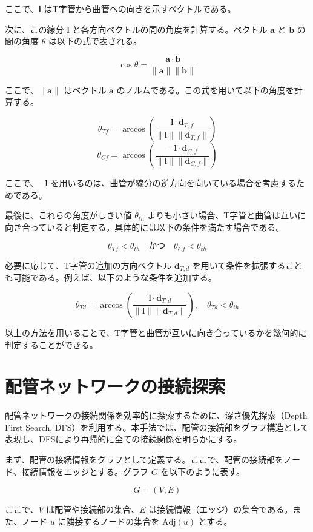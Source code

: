 ここで、$\mathbf{l}$ はT字管から曲管への向きを示すベクトルである。

次に、この線分 $\mathbf{l}$ と各方向ベクトルの間の角度を計算する。ベクトル $\mathbf{a}$ と $\mathbf{b}$ の間の角度 $\theta$ は以下の式で表される。

\[
\cos \theta = \frac{\mathbf{a} \cdot \mathbf{b}}{\|\mathbf{a}\| \|\mathbf{b}\|}
\]

ここで、$\|\mathbf{a}\|$ はベクトル $\mathbf{a}$ のノルムである。この式を用いて以下の角度を計算する。

\[
\theta_{Tf} = \arccos \left( \frac{\mathbf{l} \cdot \mathbf{d}_{T,f}}{\|\mathbf{l}\| \|\mathbf{d}_{T,f}\|} \right)
\]
\[
\theta_{Cf} = \arccos \left( \frac{-\mathbf{l} \cdot \mathbf{d}_{C,f}}{\|\mathbf{l}\| \|\mathbf{d}_{C,f}\|} \right)
\]

ここで、$-\mathbf{l}$ を用いるのは、曲管が線分の逆方向を向いている場合を考慮するためである。

最後に、これらの角度がしきい値 $\theta_{th}$ よりも小さい場合、T字管と曲管は互いに向き合っていると判定する。具体的には以下の条件を満たす場合である。

\[
\theta_{Tf} < \theta_{th} \quad \text{かつ} \quad \theta_{Cf} < \theta_{th}
\]

必要に応じて、T字管の追加の方向ベクトル $\mathbf{d}_{T,d}$ を用いて条件を拡張することも可能である。例えば、以下のような条件を追加する。

\[
\theta_{Td} = \arccos \left( \frac{\mathbf{l} \cdot \mathbf{d}_{T,d}}{\|\mathbf{l}\| \|\mathbf{d}_{T,d}\|} \right), \quad \theta_{Td} < \theta_{th}
\]

以上の方法を用いることで、T字管と曲管が互いに向き合っているかを幾何的に判定することができる。



\section{配管ネットワークの接続探索}
配管ネットワークの接続関係を効率的に探索するために、深さ優先探索（Depth First Search, DFS）を利用する。本手法では、配管の接続部をグラフ構造として表現し、DFSにより再帰的に全ての接続関係を明らかにする。

まず、配管の接続情報をグラフとして定義する。ここで、配管の接続部をノード、接続情報をエッジとする。グラフ $G$ を以下のように表す。

\[
G = (V, E)
\]

ここで、$V$ は配管や接続部の集合、$E$ は接続情報（エッジ）の集合である。また、ノード $u$ に隣接するノードの集合を $\text{Adj}(u)$ とする。

